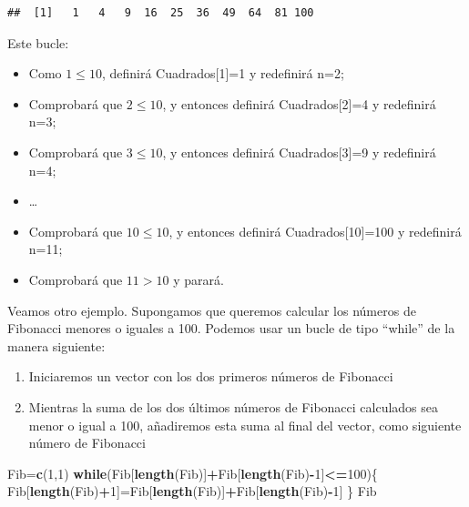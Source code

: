 \documentclass[]{book}
\newenvironment{Shaded}{\begin{snugshade}}{\end{snugshade}}
\newcommand{\ControlFlowTok}[1]{\textcolor[rgb]{0.13,0.29,0.53}{\textbf{#1}}}
\newcommand{\DecValTok}[1]{\textcolor[rgb]{0.00,0.00,0.81}{#1}}
\newcommand{\KeywordTok}[1]{\textcolor[rgb]{0.13,0.29,0.53}{\textbf{#1}}}
\newcommand{\NormalTok}[1]{#1}
\newcommand{\OperatorTok}[1]{\textcolor[rgb]{0.81,0.36,0.00}{\textbf{#1}}}
\providecommand{\tightlist}{%
  \setlength{\itemsep}{0pt}\setlength{\parskip}{0pt}}
\theoremstyle{definition}
\theoremstyle{definition}
\theoremstyle{definition}
\theoremstyle{remark}
\begin{document}
\begin{verbatim}
##  [1]   1   4   9  16  25  36  49  64  81 100
\end{verbatim}

Este bucle:

\begin{itemize}
\tightlist
\item
  Como \(1\leqslant 10\), definirá Cuadrados{[}1{]}=1 y redefinirá n=2;
\item
  Comprobará que \(2\leqslant 10\), y entonces definirá Cuadrados{[}2{]}=4 y redefinirá n=3;
\item
  Comprobará que \(3\leqslant 10\), y entonces definirá Cuadrados{[}3{]}=9 y redefinirá n=4;
\item
  \ldots{}
\item
  Comprobará que \(10\leqslant 10\), y entonces definirá Cuadrados{[}10{]}=100 y redefinirá n=11;
\item
  Comprobará que \(11>10\) y parará.
\end{itemize}

Veamos otro ejemplo. Supongamos que queremos calcular los números de Fibonacci menores o iguales a 100. Podemos usar un bucle de tipo ``while'' de la manera siguiente:

\begin{enumerate}
\def\labelenumi{\arabic{enumi}.}
\tightlist
\item
  Iniciaremos un vector con los dos primeros números de Fibonacci
\item
  Mientras la suma de los dos últimos números de Fibonacci calculados sea menor o igual a 100, añadiremos esta suma al final del vector, como siguiente número de Fibonacci
\end{enumerate}

\begin{Shaded}
\begin{Highlighting}[]
\NormalTok{Fib=}\KeywordTok{c}\NormalTok{(}\DecValTok{1}\NormalTok{,}\DecValTok{1}\NormalTok{) }
\ControlFlowTok{while}\NormalTok{(Fib[}\KeywordTok{length}\NormalTok{(Fib)]}\OperatorTok{+}\NormalTok{Fib[}\KeywordTok{length}\NormalTok{(Fib)}\OperatorTok{-}\DecValTok{1}\NormalTok{]}\OperatorTok{<=}\DecValTok{100}\NormalTok{)\{}
\NormalTok{  Fib[}\KeywordTok{length}\NormalTok{(Fib)}\OperatorTok{+}\DecValTok{1}\NormalTok{]=Fib[}\KeywordTok{length}\NormalTok{(Fib)]}\OperatorTok{+}\NormalTok{Fib[}\KeywordTok{length}\NormalTok{(Fib)}\OperatorTok{-}\DecValTok{1}\NormalTok{] }
\NormalTok{  \} }
\NormalTok{Fib}
\end{Highlighting}
\end{Shaded}
\end{document}
